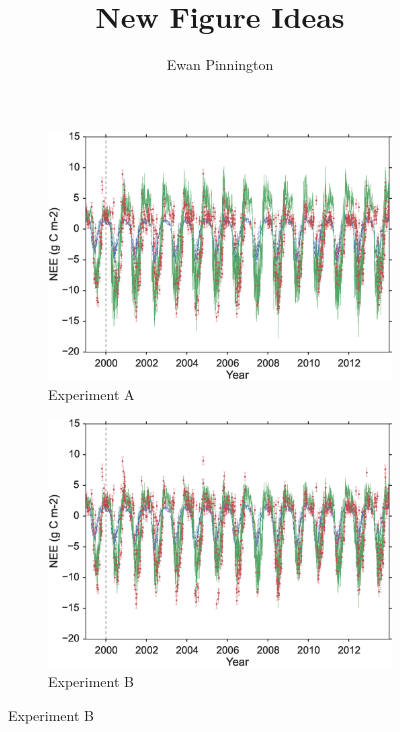 \documentclass[11pt]{article}
\title{New Figure Ideas}
\author{Ewan Pinnington}
\begin{document}
\maketitle

\begin{figure}
    \centering
    \begin{subfigure}[b]{0.49\textwidth}
        \includegraphics[width=\textwidth]{A4dvar.eps}
        \caption{Experiment A}
        \label{fig:4dvardiagBR}
    \end{subfigure}
    \begin{subfigure}[b]{0.49\textwidth}
        \includegraphics[width=\textwidth]{B4dvar.eps}
        \caption{Experiment B}
        \label{fig:4dvaredcBR}
    \end{subfigure}

\end{figure}
\end{document}
